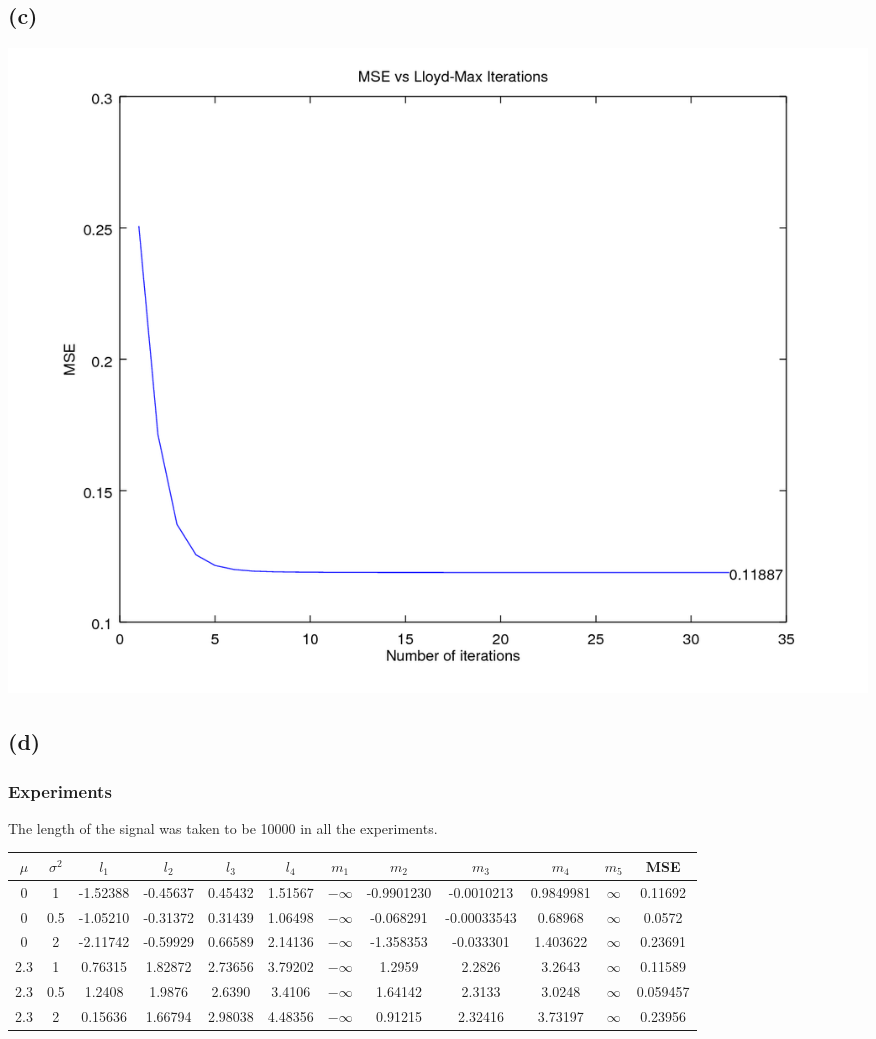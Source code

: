 \documentclass[a4paper,fleqn,11pt]{article}
\theoremstyle{mytheor}
\begin{document}
\subsection*{(c)}
\begin{center}
\includegraphics[scale=0.55]{../results/lloyd.png}
\end{center}
\subsection*{(d)}
\subsubsection*{Experiments}
The length of the signal was taken to be 10000 in all the experiments. \\
\begin{tabular}{| c | c | c | c | c | c | c | c | c | c | c | c |}
	\hline
	$\mu$ &	$\sigma^2$ &$l_1$ &		$l_2$ &		$l_3$ &		$l_4$ &		$m_1$ &		$m_2$ &			$m_3$ &		$m_4$ &		$m_5$ &		MSE \\
	\hline
	0 &		1 &			-1.52388 &	-0.45637 &	0.45432 &	1.51567 &	$-\infty$ &	-0.9901230 &	-0.0010213 &	0.9849981 &	$\infty$ &	0.11692 \\
	\hline
	0 &		0.5 &		-1.05210 &	-0.31372 &	0.31439 &	1.06498 &	$-\infty$ &	-0.068291 &		-0.00033543 &	0.68968 &	$\infty$ &	0.0572 \\
	\hline
	0 &		2 &			-2.11742 &  -0.59929 & 0.66589 & 	2.14136 &	$-\infty$ &	-1.358353 &		-0.033301 &		1.403622 &	$\infty$ &	0.23691 \\
	\hline
	2.3 &   1 &			0.76315 &	1.82872 &	2.73656 &	3.79202 &	$-\infty$ &	1.2959 &		2.2826 &	3.2643 &	$\infty$ &	0.11589 \\
	\hline
	2.3 &	0.5 &		1.2408 &	1.9876 &	2.6390 &	3.4106 &	$-\infty$ &	1.64142 &		2.3133 &	3.0248 &	$\infty$ &	0.059457 \\
	\hline
	2.3 &	2 &			0.15636 &	1.66794 & 	2.98038 &	4.48356 &	$-\infty$ &	0.91215 &		2.32416 &	3.73197 &	$\infty$ &	0.23956 \\
	\hline
\end{tabular}
\end{document}
